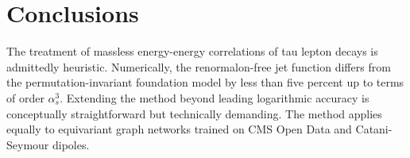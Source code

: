 \section{Conclusions}\label{sec:conclusions}

The treatment of massless energy-energy correlations of tau lepton
decays is admittedly heuristic. Numerically, the renormalon-free jet
function differs from the permutation-invariant foundation model by less
than five percent up to terms of order $\alpha_s^3$. Extending the
method beyond leading logarithmic accuracy is conceptually
straightforward but technically demanding. The method applies equally to
equivariant graph networks trained on CMS Open Data and Catani-Seymour
dipoles.

